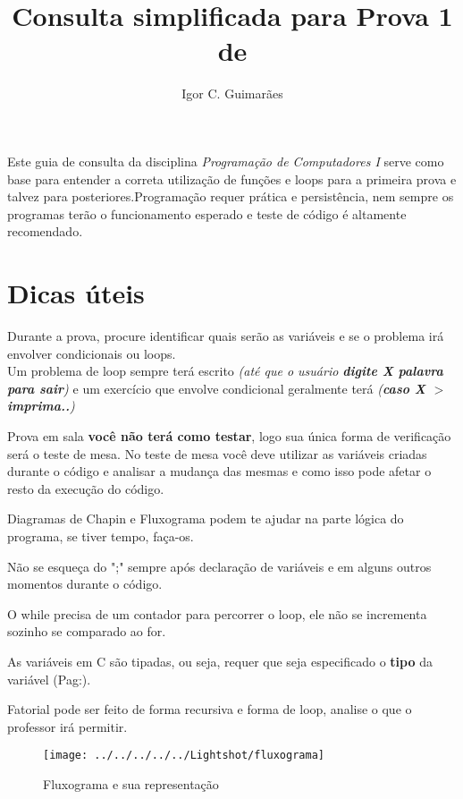 \documentclass[12pt]{article}
\title{Consulta simplificada para Prova 1 de \disciplina}
\author{Igor C. Guimarães \inst{1}}
\newcommand{\disciplina}{\textit{Programação de Computadores I }}
\begin{document}
 

\maketitle

     
\begin{resumo} 
  Este guia de consulta da disciplina \disciplina serve como base para entender a correta utilização de funções e loops para a primeira prova e talvez para posteriores.Programação requer prática e persistência, nem sempre os programas terão o funcionamento esperado e teste de código é altamente recomendado. 
\end{resumo}
\newpage
\tableofcontents
\newpage
\section{Dicas úteis}
Durante a prova, procure identificar quais serão as variáveis e se o problema irá envolver condicionais ou loops. \\Um problema de loop sempre terá escrito \textit{(até que o usuário \textbf{digite X palavra para sair})} e um exercício que envolve condicional geralmente terá \textit{(\textbf{caso X $>$ imprima..})}

\begin{flushleft}
	Prova em sala \textbf{você não terá como testar}, logo sua única forma de verificação será o teste de mesa. No teste de mesa você deve utilizar as variáveis criadas durante o código e analisar a mudança das mesmas e como isso pode afetar o resto da execução do código.
	
	Diagramas de Chapin e Fluxograma podem te ajudar na parte lógica do programa, se tiver tempo, faça-os.
	
	Não se esqueça do ";" sempre após declaração de variáveis e em alguns outros momentos durante o código.
	
	O while precisa de um contador para percorrer o loop, ele não se incrementa sozinho se comparado ao for.
	
	As variáveis em C são tipadas, ou seja, requer que seja especificado o \textbf{tipo} da variável (Pag:\pageref{tipovariavel}).
	
	Fatorial pode ser feito de forma recursiva e forma de loop, analise o que o professor irá permitir.
	
	
	
	
	
\end{flushleft}
\begin{figure}[h]
	\centering
	\texttt{[image: ../../../../../Lightshot/fluxograma]}
	\caption{Fluxograma e sua representação}
	\label{fig:fluxograma}
\end{figure}
\end{document}

